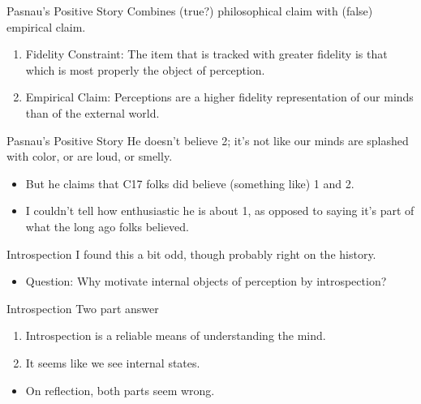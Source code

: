 \documentclass[
  17pt,
  letterpaper,
  ignorenonframetext,
  aspectratio=169,
  handout]{beamer}
\providecommand{\tightlist}{%
  \setlength{\itemsep}{0pt}\setlength{\parskip}{0pt}}\usepackage{longtable,booktabs,array}
\begin{document}
\begin{frame}{Pasnau's Positive Story}
\protect\hypertarget{pasnaus-positive-story}{}
Combines (true?) philosophical claim with (false) empirical claim.

\begin{enumerate}[<+->]
\tightlist
\item
  Fidelity Constraint: The item that is tracked with greater fidelity is
  that which is most properly the object of perception.
\item
  Empirical Claim: Perceptions are a higher fidelity representation of
  our minds than of the external world.
\end{enumerate}
\end{frame}

\begin{frame}{Pasnau's Positive Story}
\protect\hypertarget{pasnaus-positive-story-1}{}
He doesn't believe 2; it's not like our minds are splashed with color,
or are loud, or smelly.

\begin{itemize}[<+->]
\tightlist
\item
  But he claims that C17 folks did believe (something like) 1 and 2.
\item
  I couldn't tell how enthusiastic he is about 1, as opposed to saying
  it's part of what the long ago folks believed.
\end{itemize}
\end{frame}

\begin{frame}{Introspection}
\protect\hypertarget{introspection}{}
I found this a bit odd, though probably right on the history.

\begin{itemize}[<+->]
\tightlist
\item
  Question: Why motivate internal objects of perception by
  introspection?
\end{itemize}
\end{frame}

\begin{frame}{Introspection}
\protect\hypertarget{introspection-1}{}
Two part answer

\begin{enumerate}[<+->]
\tightlist
\item
  Introspection is a reliable means of understanding the mind.
\item
  It seems like we see internal states.
\end{enumerate}

\begin{itemize}[<+->]
\tightlist
\item
  On reflection, both parts seem wrong.
\end{itemize}
\end{frame}
\end{document}
